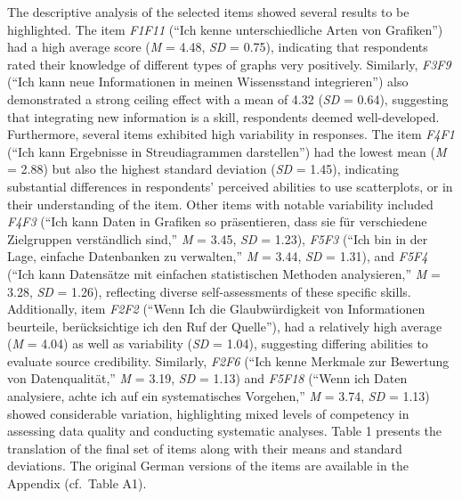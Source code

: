 \documentclass[
  12pt,
  a4paper,
  twoside]{article}
\begin{document}
The descriptive analysis of the selected items showed several results to be highlighted. The item \emph{F1F11} (``Ich kenne unterschiedliche Arten von Grafiken'') had a high average score (\emph{M} = 4.48, \emph{SD} = 0.75), indicating that respondents rated their knowledge of different types of graphs very positively. Similarly, \emph{F3F9} (``Ich kann neue Informationen in meinen Wissensstand integrieren'') also demonstrated a strong ceiling effect with a mean of 4.32 (\emph{SD} = 0.64), suggesting that integrating new information is a skill, respondents deemed well-developed.
Furthermore, several items exhibited high variability in responses. The item \emph{F4F1} (``Ich kann Ergebnisse in Streudiagrammen darstellen'') had the lowest mean (\emph{M} = 2.88) but also the highest standard deviation (\emph{SD} = 1.45), indicating substantial differences in respondents' perceived abilities to use scatterplots, or in their understanding of the item. Other items with notable variability included \emph{F4F3} (``Ich kann Daten in Grafiken so präsentieren, dass sie für verschiedene Zielgruppen verständlich sind,'' \emph{M} = 3.45, \emph{SD} = 1.23), \emph{F5F3} (``Ich bin in der Lage, einfache Datenbanken zu verwalten,'' \emph{M} = 3.44, \emph{SD} = 1.31), and \emph{F5F4} (``Ich kann Datensätze mit einfachen statistischen Methoden analysieren,'' \emph{M} = 3.28, \emph{SD} = 1.26), reflecting diverse self-assessments of these specific skills.
Additionally, item \emph{F2F2} (``Wenn Ich die Glaubwürdigkeit von Informationen beurteile, berücksichtige ich den Ruf der Quelle''), had a relatively high average (\emph{M} = 4.04) as well as variability (\emph{SD} = 1.04), suggesting differing abilities to evaluate source credibility. Similarly, \emph{F2F6} (``Ich kenne Merkmale zur Bewertung von Datenqualität,'' \emph{M} = 3.19, \emph{SD} = 1.13) and \emph{F5F18} (``Wenn ich Daten analysiere, achte ich auf ein systematisches Vorgehen,'' \emph{M} = 3.74, \emph{SD} = 1.13) showed considerable variation, highlighting mixed levels of competency in assessing data quality and conducting systematic analyses. Table 1 presents the translation of the final set of items along with their means and standard deviations. The original German versions of the items are available in the Appendix (cf.~Table A1).
\end{document}
